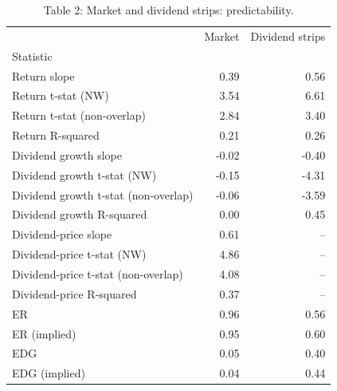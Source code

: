 \begin{table}
\caption{Table 2: Market and dividend strips: predictability.}
\label{tab:replication_2}
\begin{tabular}{lrr}
\toprule
 & Market & Dividend strips \\
Statistic &  &  \\
\midrule
Return slope & 0.39 & 0.56 \\
Return t-stat (NW) & 3.54 & 6.61 \\
Return t-stat (non-overlap) & 2.84 & 3.40 \\
Return R-squared & 0.21 & 0.26 \\
Dividend growth slope & -0.02 & -0.40 \\
Dividend growth t-stat (NW) & -0.15 & -4.31 \\
Dividend growth t-stat (non-overlap) & -0.06 & -3.59 \\
Dividend growth R-squared & 0.00 & 0.45 \\
Dividend-price slope & 0.61 & -- \\
Dividend-price t-stat (NW) & 4.86 & -- \\
Dividend-price t-stat (non-overlap) & 4.08 & -- \\
Dividend-price R-squared & 0.37 & -- \\
ER & 0.96 & 0.56 \\
ER (implied) & 0.95 & 0.60 \\
EDG & 0.05 & 0.40 \\
EDG (implied) & 0.04 & 0.44 \\
\bottomrule
\end{tabular}
\end{table}
